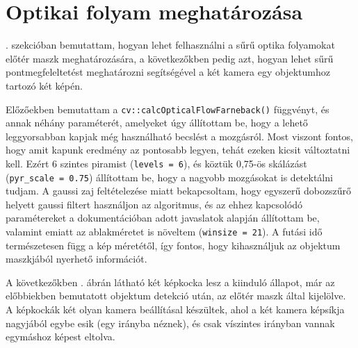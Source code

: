 \section{Optikai folyam meghatározása}

. szekcióban bemutattam, hogyan lehet felhasználni a sűrű optika folyamokat előtér maszk meghatározására, a következőkben pedig azt, hogyan lehet sűrű pontmegfeleltetést meghatározni segítségével a két kamera egy objektumhoz tartozó két képén.

Előzőekben bemutattam a \texttt{cv::calcOpticalFlowFarneback()} függvényt, és annak néhány paraméterét, amelyeket úgy állítottam be, hogy a lehető leggyorsabban kapjak még használható becslést a mozgásról. Most viszont fontos, hogy amit kapunk eredmény az pontosabb legyen, tehát ezeken kicsit változtatni kell. Ezért 6 szintes piramist (\texttt{levels = 6}), és köztük 0,75-ös skálázást (\texttt{pyr\_scale = 0.75}) állítottam be, hogy a nagyobb mozgásokat is detektálni tudjam. A gaussi zaj feltételezése miatt bekapcsoltam, hogy egyszerű dobozszűrő helyett gaussi filtert használjon az algoritmus, és az ehhez kapcsolódó paramétereket a dokumentációban adott javaslatok alapján állítottam be, valamint emiatt az ablakméretet is növeltem (\texttt{winsize = 21}). A futási idő természetesen függ a kép méretétől, így fontos, hogy kihasználjuk az objektum maszkjából nyerhető információt.

A következőkben . ábrán látható két képkocka lesz a kiinduló állapot, már az előbbiekben bemutatott objektum detekció után, az előtér maszk által kijelölve. A képkockák két olyan kamera beállításal készültek, ahol a két kamera képsíkja nagyjából egybe esik (egy irányba néznek), és csak víszintes irányban vannak egymáshoz képest eltolva.

